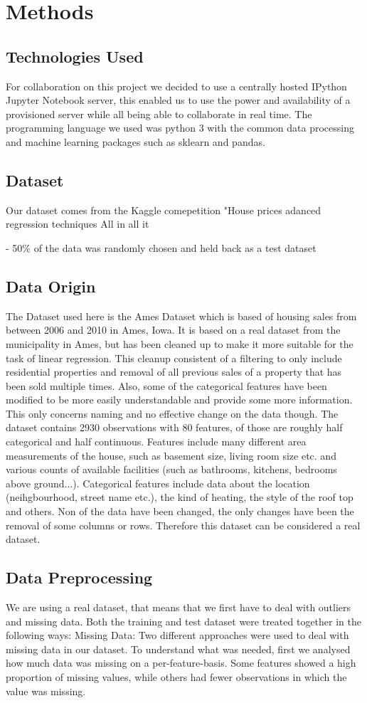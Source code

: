 \section{Methods}
\subsection{Technologies Used}
For collaboration on this project we decided to use a centrally hosted IPython Jupyter Notebook server, this enabled us to use the power and availability of a provisioned server while all being able to collaborate in real time. The programming language we used was python 3 with the common data processing and machine learning packages such as sklearn and pandas.
\subsection{Dataset} 
Our dataset comes from the Kaggle comepetition "House prices adanced regression techniques \cite{kaggle}
All in all it 

- 50\% of the data was randomly chosen and held back as a test dataset
\subsection{Data Origin}
The Dataset used here is the Ames Dataset \cite{cock_2011} which is based of housing sales from between 2006 and 2010 in Ames, Iowa.
It is based on a real dataset from the municipality in Ames, but has been cleaned up to make it more suitable for the task of linear regression.
This cleanup consistent of a filtering to only include residential properties and removal of all previous sales of a property that has been sold multiple times.
Also, some of the categorical features have been modified to be more easily understandable and provide some more information. This only concerns naming and no effective change on the data though.
The dataset contains 2930 observations with 80 features, of those are roughly half categorical and half continuous. Features include many different area measurements of the house, such as basement size, living room size etc. and various counts of available facilities (such as bathrooms, kitchens, bedrooms above ground...). Categorical features include data about the location (neihgbourhood, street name etc.), the kind of heating, the style of the roof top and others.
Non of the data have been changed, the only changes have been the removal of some columns or rows. Therefore this dataset can be considered a real dataset.
\subsection{Data Preprocessing}
We are using a real dataset, that means that we first have to deal with outliers and missing data. Both the training and test dataset were treated together in the following ways:
Missing Data:\newline
Two different approaches were used to deal with missing data in our dataset. To understand what was needed, first we analysed how much data was missing on a per-feature-basis. Some features showed a high proportion of missing values, while others had fewer observations in which the value was missing.

